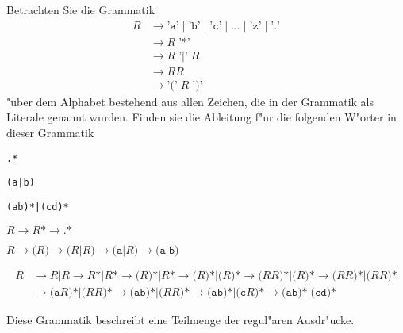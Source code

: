 Betrachten Sie die Grammatik 
\begin{align*}
R&\to \texttt{'a'} \;|\; \texttt{'b'} \;|\; \texttt{'c'} \;|\;\dots\;|\; \texttt{'z'} \;|\; \texttt{'.'}\\
 &\to R\; \texttt{'*'}\\
 &\to R\; \texttt{'|'}\; R\\
 &\to RR\\
 &\to \texttt{'('} \; R \; \texttt{')'}
\end{align*}
"uber dem Alphabet bestehend aus allen Zeichen, die in der Grammatik als
Literale genannt wurden.
Finden sie die Ableitung f"ur die folgenden W"orter in dieser Grammatik
\begin{teilaufgaben}
\item \texttt{.*}
\item \texttt{(a|b)}
\item \texttt{(ab)*|(cd)*}
\end{teilaufgaben}

\begin{loesung}
\begin{teilaufgaben}
\item
\(
R\to R\texttt{*}\to \texttt{.*}
\)
\item \(
R\to \texttt{(} R\texttt{)}
  \to \texttt{(}R\texttt{|}R\texttt{)}
  \to \texttt{(a|}R\texttt{)}
  \to \texttt{(a|b)}
\)
\item
\begin{align*}
R&\to R\texttt{|}R
  \to R\texttt{*|}R\texttt{*}
  \to \texttt{(}R\texttt{)*|}R\texttt{*}
  \to \texttt{(}R\texttt{)*|(}R\texttt{)*}
  \to \texttt{(}RR\texttt{)*|(}R\texttt{)*}
  \to \texttt{(}RR\texttt{)*|(}RR\texttt{)*}
\\
 &\to \texttt{(a}R\texttt{)*|(}RR\texttt{)*}
  \to \texttt{(ab)*|(}RR\texttt{)*}
  \to \texttt{(ab)*|(c}R\texttt{)*}
  \to \texttt{(ab)*|(cd)*}
\end{align*}
\end{teilaufgaben}
\end{loesung}

\begin{diskussion}
Diese Grammatik beschreibt eine Teilmenge der regul"aren Ausdr"ucke.
\end{diskussion}

